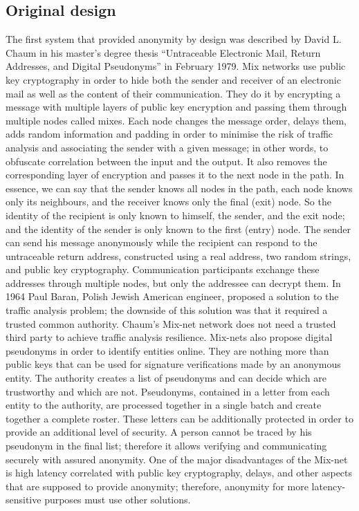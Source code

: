 \subsection{Original design}
The first system that provided anonymity by design was described by David L. Chaum in his master’s degree thesis “Untraceable Electronic Mail, Return Addresses, and Digital Pseudonyms” in February 1979. Mix networks use public key cryptography in order to hide both the sender and receiver of an electronic mail as well as the content of their communication. They do it by encrypting a message with multiple layers of public key encryption and passing them through multiple nodes called mixes. Each node changes the message order, delays them, adds random information and padding in order to minimise the risk of traffic analysis and associating the sender with a given message; in other words, to obfuscate correlation between the input and the output. It also removes the corresponding layer of encryption and passes it to the next node in the path.
In essence, we can say that the sender knows all nodes in the path, each node knows only its neighbours, and the receiver knows only the final (exit) node. So the identity of the recipient is only known to himself, the sender, and the exit node; and the identity of the sender is only known to the first (entry) node.
The sender can send his message anonymously while the recipient can respond to the untraceable return address, constructed using a real address, two random strings, and public key cryptography. Communication participants exchange these addresses through multiple nodes, but only the addressee can decrypt them.
In 1964 \cite{Baran1964} Paul Baran, Polish Jewish American engineer, proposed a solution to the traffic analysis problem; the downside of this solution was that it required a trusted common authority. Chaum’s Mix-net network does not need a trusted third party to achieve traffic analysis resilience. 
Mix-nets also propose digital pseudonyms in order to identify entities online. They are nothing more than public keys that can be used for signature verifications made by an anonymous entity. The authority creates a list of pseudonyms and can decide which are trustworthy and which are not. Pseudonyms, contained in a letter from each entity to the authority, are processed together in a single batch and create together a complete roster. These letters can be additionally protected in order to provide an additional level of security. A person cannot be traced by his pseudonym in the final list; therefore it allows verifying and communicating securely with assured anonymity. 
One of the major disadvantages of the Mix-net is high latency correlated with public key cryptography, delays, and other aspects that are supposed to provide anonymity; therefore, anonymity for more latency-sensitive purposes must use other solutions.


